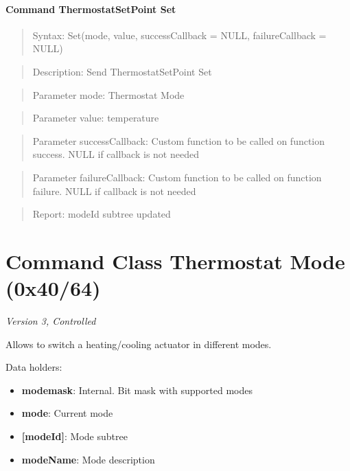 \paragraph{Command ThermostatSetPoint Set}
\begin{quote}Syntax: Set(mode, value, successCallback = NULL, failureCallback = NULL)\end{quote}
\begin{quote}Description: Send ThermostatSetPoint Set\end{quote}
\begin{quote}Parameter mode: Thermostat Mode\end{quote}
\begin{quote}Parameter value: temperature\end{quote}
\begin{quote}Parameter successCallback: Custom function to be called on function success. NULL if callback is not needed\end{quote}
\begin{quote}Parameter failureCallback: Custom function to be called on function failure. NULL if callback is not needed\end{quote}
\begin{quote}Report: modeId subtree updated\end{quote}


\section{Command Class Thermostat Mode (0x40/64)}

\textit{Version 3, Controlled}
\newline

Allows to switch a heating/cooling actuator in different modes.
\newline

\noindent
Data holders:

\begin{itemize}
\item \textbf{modemask}: Internal. Bit mask with supported modes
\item \textbf{mode}: Current mode
\item \textbf{[modeId]}: Mode subtree
\item \qquad\textbf{modeName}: Mode description
\end{itemize}

